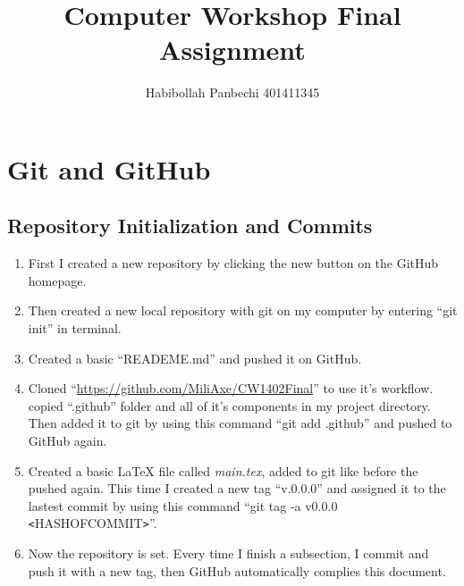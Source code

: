 \documentclass[12pt]{article}
\title{Computer Workshop Final Assignment}
\author{Habibollah Panbechi 401411345}
\begin{document}
\begin{titlepage}
    \maketitle
\end{titlepage}
\tableofcontents
\newpage

\section{Git and GitHub}
\subsection{Repository Initialization and Commits}
\begin{enumerate}
    \item First I created a new repository by clicking the new button on the GitHub homepage.
    \item Then created a new local repository with git on my computer by entering ``git init'' in terminal.
    \item Created a basic ``READEME.md'' and pushed it on GitHub.
    \item Cloned ``\href{https://github.com/MiliAxe/CW1402Final}{https://github.com/MiliAxe/CW1402Final}'' to use it's workflow. copied ``.github'' folder and all of it's components in my project directory. Then added it to git by using this command ``git add .github'' and pushed to GitHub again.
    \item Created a basic \LaTeX{} file called \emph{main.tex}, added to git like before the pushed again. This time I created a new tag ``v.0.0.0'' and assigned it to the lastest commit by using this command ``git tag -a v0.0.0 \verb|<|HASHOFCOMMIT\verb|>|''.
    \item Now the repository is set. Every time I finish a subsection, I commit and push it with a new tag, then GitHub automatically complies this document.
\end{enumerate}
\end{document}
